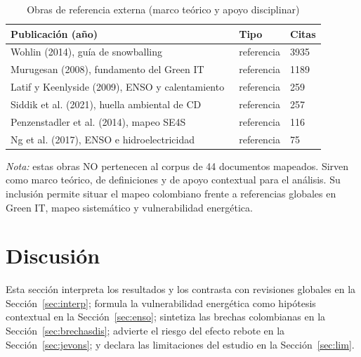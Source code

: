 \documentclass[conference]{IEEEtran}
\begin{document}
\begin{table}[H]
\caption{Obras de referencia externa (marco te\'orico y apoyo disciplinar)}
\label{tab:citas-referencia}
\centering
\footnotesize
\begin{tabular}{@{}R{4.7cm} R{1.3cm} R{0.9cm} @{}}
\toprule
\textbf{Publicaci\'on (año)} & \textbf{Tipo} & \textbf{Citas} \\
\midrule
Wohlin (2014), gu\'ia de snowballing~\cite{wohlin2014} & referencia & 3935 \\
Murugesan (2008), fundamento del Green IT~\cite{murugesan2008} & referencia & 1189 \\
Latif y Keenlyside (2009), ENSO y calentamiento~\cite{latif2009} & referencia & 259 \\
Siddik et al. (2021), huella ambiental de CD~\cite{siddik2021} & referencia & 257 \\
Penzenstadler et al. (2014), mapeo SE4S~\cite{penzenstadler2014} & referencia & 116 \\
Ng et al. (2017), ENSO e hidroelectricidad~\cite{ng2017} & referencia & 75 \\
\bottomrule
\end{tabular}
\par\vspace{2pt}
\scriptsize\textit{Nota:} estas obras NO pertenecen al corpus de 44 documentos mapeados. Sirven como marco te\'orico, de definiciones y de apoyo contextual para el an\'alisis. Su inclusi\'on permite situar el mapeo colombiano frente a referencias globales en Green IT, mapeo sistem\'atico y vulnerabilidad energ\'etica.
\end{table}

\section{Discusi\'on}\label{sec:dis}
Esta secci\'on interpreta los resultados y los contrasta con revisiones globales en la Secci\'on~\ref{sec:interp}; formula la vulnerabilidad energ\'etica como hip\'otesis contextual en la Secci\'on~\ref{sec:enso}; sintetiza las brechas colombianas en la Secci\'on~\ref{sec:brechasdis}; advierte el riesgo del efecto rebote en la Secci\'on~\ref{sec:jevons}; y declara las limitaciones del estudio en la Secci\'on~\ref{sec:lim}.
\end{document}
